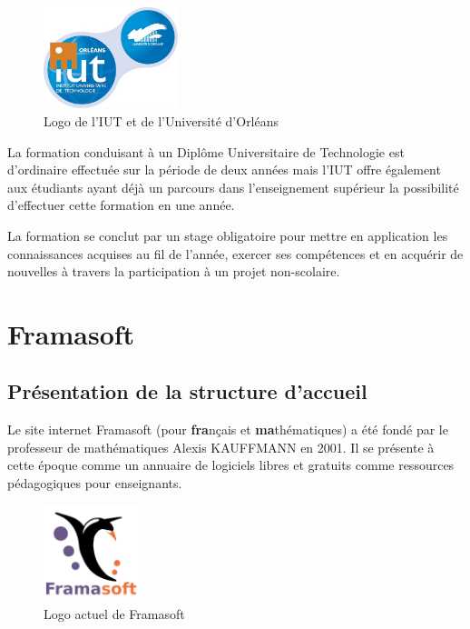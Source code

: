 \documentclass[10pt,a4paper, twoside]{report}
\begin{document}
	\begin{figure}[ht]
		\centering
		\includegraphics[width=0.35\textwidth]{images/logo-iut.png}
		\caption{Logo de l'IUT et de l'Université d'Orléans}
		\label{logo-iut}
	\end{figure}
	
	La formation conduisant à un Diplôme Universitaire de Technologie est d'ordinaire effectuée sur la période de deux années mais l'IUT offre également aux étudiants ayant déjà un parcours dans l'enseignement supérieur la possibilité d'effectuer cette formation en une année.
	
	La formation se conclut par un stage obligatoire pour mettre en application les connaissances acquises au fil de l'année, exercer ses compétences et en acquérir de nouvelles à travers la participation à un projet non-scolaire.
	
	\section{Framasoft}
	\subsection{Présentation de la structure d'accueil}
	
	Le site internet Framasoft (pour \textbf{fra}nçais et \textbf{ma}thématiques) a été fondé par le professeur de mathématiques Alexis KAUFFMANN en 2001. Il se présente à cette époque comme un annuaire de logiciels libres et gratuits comme ressources pédagogiques pour enseignants.
	
	\begin{figure}[ht]
		\centering
		\includegraphics[width=0.25\textwidth]{images/Framasoft-Logo.png}
		\caption{Logo actuel de Framasoft}
		\label{logo-framasoft}
	\end{figure}
	
\end{document}
